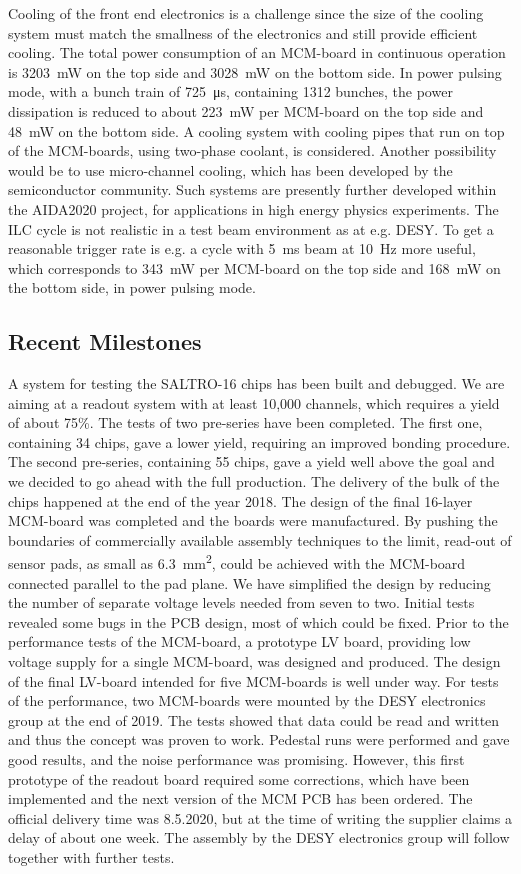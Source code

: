 Cooling of the front end electronics is a challenge since the size of the cooling system must match the smallness of the electronics and still provide efficient cooling. The total power consumption of an MCM-board in continuous operation
is \SI{3203}{mW} on the top side and \SI{3028}{mW} on the bottom side. In power pulsing mode, with a bunch train of \SI{725}{\micro \second}, containing 1312 bunches, the power dissipation is reduced to about \SI{223}{mW} per MCM-board on the top side and \SI{48}{mW} on the bottom side. A cooling system with cooling pipes that run on top of the MCM-boards, using two-phase  coolant, is considered. Another possibility would be to use micro-channel cooling, which has been developed by the semiconductor community. Such systems are presently further developed within the AIDA2020 project, for applications in high energy physics experiments. The ILC cycle is not realistic in a test beam environment as at e.g. DESY. To get a reasonable trigger rate is e.g. a cycle with \SI{5}{ms} beam at \SI{10}{Hz} more useful, which corresponds to \SI{343}{mW} per MCM-board on the top side and \SI{168}{mW} on the bottom side, in power pulsing mode.

\subsection{Recent Milestones}
A system for testing the SALTRO-16 chips has been built and debugged. We are aiming at a readout system with at least 10,000 channels, which requires a yield of about 75\%. The tests of two pre-series have been completed. The first one, containing 34 chips, gave a lower yield, requiring an improved bonding procedure. The second pre-series, containing 55 chips, gave a yield well above the goal and we decided to go ahead with the full production.
The delivery of the bulk of the chips happened at the end of the year 2018.
The design of the final 16-layer MCM-board was completed and the boards were manufactured. By pushing the boundaries of commercially available assembly techniques to the limit, read-out of sensor pads, as small as \SI{6.3}{\milli\meter\squared}, could be achieved with the MCM-board connected parallel to the pad plane. We have simplified the design by reducing the number of separate voltage levels needed from seven to two. Initial tests revealed some bugs in the PCB design, most of which could be fixed. Prior to the performance tests of the MCM-board, a prototype LV board, providing low voltage supply for a single MCM-board, was designed and produced. The design of the final LV-board intended for five MCM-boards is well under way.
For tests of the performance, two MCM-boards were mounted by the DESY electronics group at the end of 2019. The tests showed that data could be read and written and thus the concept was proven to work. Pedestal runs were performed and gave good results, and the noise performance was promising. However, this first prototype of the readout board required some corrections, which have been implemented and the next version of the MCM PCB has been ordered. The official delivery time was 8.5.2020, but at the time of writing the supplier claims a delay of about one week. The assembly by the DESY electronics group will follow together with further tests.

